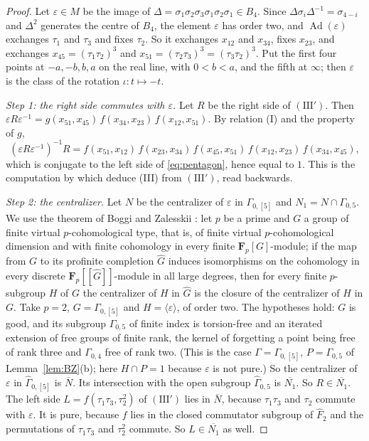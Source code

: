 \documentclass[11pt,a4paper]{article}
\theoremstyle{plain}
\theoremstyle{definition}
\theoremstyle{remark}
\newcommand{\F}{\mathbf F}
\newcommand{\Fh}{\widehat F}
\newcommand{\Gh}{\widehat\Gamma}
\newcommand{\Ad}{\operatorname{Ad}}
\begin{document}
\begin{proof}
Let $\varepsilon\in M$ be the image of $\Delta=\sigma_1\sigma_2\sigma_3\sigma_1\sigma_2\sigma_1\in B_4$. Since
$\Delta\sigma_i\Delta^{-1}=\sigma_{4-i}$ and $\Delta^2$ generates the centre of $B_4$, the element $\varepsilon$
has order two, and $\Ad(\varepsilon)$ exchanges $\tau_1$ and $\tau_3$ and fixes $\tau_2$. So it exchanges
$x_{12}$ and $x_{34}$, fixes $x_{23}$, and exchanges $x_{45}=(\tau_1\tau_2)^3$ and
$x_{51}=(\tau_2\tau_3)^3=(\tau_3\tau_2)^3$. Put the first four points at $-a,-b,b,a$ on the real line, with
$0<b<a$, and the fifth at $\infty$; then $\varepsilon$ is the class of the rotation $\iota:t\mapsto-t$.

\emph{Step 1: the right side commutes with $\varepsilon$.} Let $R$ be the right side of $(\mathrm{III}')$. Then
$\varepsilon R\varepsilon^{-1}=g(x_{51},x_{45})\,f(x_{34},x_{23})\,f(x_{12},x_{51})$. By relation (I) and the
property of $g$,
\[
 (\varepsilon R\varepsilon^{-1})^{-1}R
 =f(x_{51},x_{12})\,f(x_{23},x_{34})\,f(x_{45},x_{51})\,f(x_{12},x_{23})\,f(x_{34},x_{45}),
\]
which is conjugate to the left side of \eqref{eq:pentagon}, hence equal to $1$. This is the computation by which
\cite[\S1]{NS} deduce (III) from $(\mathrm{III}')$, read backwards.

\emph{Step 2: the centralizer.} Let $N$ be the centralizer of $\varepsilon$ in $\Gamma_{0,[5]}$ and
$N_1=N\cap\Gamma_{0,5}$. We use the theorem of Boggi and Zalesskii \cite[Theorem A\,(iii)]{BZ}: let $p$ be a prime
and $G$ a group of finite virtual $p$-cohomological type, that is, of finite virtual $p$-cohomological dimension
and with finite cohomology in every finite $\F_p[G]$-module; if the map from $G$ to its profinite completion
$\widehat G$ induces isomorphisms on the cohomology in every discrete $\F_p[[\widehat G]]$-module in all large
degrees, then for every finite $p$-subgroup $H$ of $G$ the centralizer of $H$ in $\widehat G$ is the closure of the
centralizer of $H$ in $G$. Take $p=2$, $G=\Gamma_{0,[5]}$ and $H=\langle\varepsilon\rangle$, of order two. The
hypotheses hold: $G$ is good, and its subgroup $\Gamma_{0,5}$ of finite index is torsion-free and an iterated
extension of free groups of finite rank, the kernel of forgetting a point being free of rank three and
$\Gamma_{0,4}$ free of rank two. (This is the case $\Gamma=\Gamma_{0,[5]}$, $P=\Gamma_{0,5}$ of
Lemma~\ref{lem:BZ}(b); here $H\cap P=1$ because $\varepsilon$ is not pure.) So the centralizer of $\varepsilon$ in
$\Gh_{0,[5]}$ is $\overline N$. Its intersection with the open subgroup $\Gh_{0,5}$ is $\overline{N_1}$. So
$R\in\overline{N_1}$. The left side
$L=f(\tau_1\tau_3,\tau_2^2)$ of $(\mathrm{III}')$ lies in $\overline N$, because $\tau_1\tau_3$ and $\tau_2$ commute
with $\varepsilon$. It is pure, because $f$ lies in the closed commutator subgroup of $\Fh_2$ and the permutations
of $\tau_1\tau_3$ and $\tau_2^2$ commute. So $L\in\overline{N_1}$ as well.


\end{proof}
\end{document}
